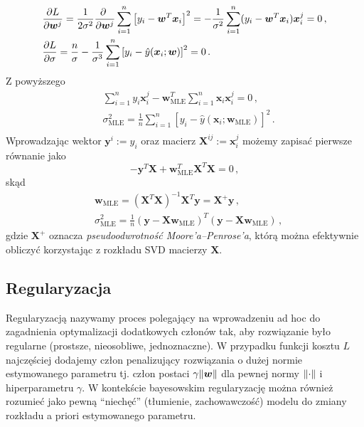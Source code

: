 \documentclass{myclass}
\numberwithin{equation}{subsection}
\begin{document}
\begin{equation}
    \begin{split}
        &\pdv{L}{\bm{w}^j} = \frac{1}{2\sigma^2}\pdv{~}{\bm{w}^j}\sum_{i=1}^n\left[y_i - \bm{w}^T\bm{x}_i\right]^2 = -\frac{1}{\sigma^2}\sum_{i=1}^n (y_i - \bm{w}^T\bm{x}_i)\bm{x}_i^j = 0\,,\\
        &\pdv{L}{\sigma} = \frac{n}{\sigma} - \frac{1}{\sigma^3}\sum_{i=1}^n \left[y_i - \hat{y}(\bm{x}_i; \bm{w})\right]^2 = 0\,.
    \end{split}
\end{equation}
Z powyższego
\begin{equation}
    \begin{split}
        &\sum_{i=1}^n y_i\bm{x}_i^j - \bm{w}_\mathrm{MLE}^T\sum_{i=1}^n\bm{x}_i\bm{x}_i^j = 0\,,\\
        &\sigma_\mathrm{MLE}^2 = \frac{1}{n} \sum_{i=1}^n \left[y_i - \hat{y}(\bm{x}_i; \bm{w}_\mathrm{MLE})\right]^2\,.\\
    \end{split}
\end{equation}
Wprowadzając wektor \(\bm{y}^i := y_i\) oraz macierz \(\bm{X}^{ij} := \bm{x}_i^j\) możemy zapisać
pierwsze równanie jako
\begin{equation}
    -\bm{y}^T\bm{X} + \bm{w}^T_\mathrm{MLE} \bm{X}^T\bm{X} = 0\,,
\end{equation}
skąd
\begin{equation}\boxed{
    \begin{split}
        &\bm{w}_\mathrm{MLE} = \left(\bm{X}^T\bm{X}\right)^{-1}\bm{X}^T\bm{y} = \bm{X}^+\bm{y}\,,\\
        &\sigma_\mathrm{MLE}^2 = \frac{1}{n}\left(\bm{y} - \bm{X}\bm{w}_\mathrm{MLE}\right)^T\left(\bm{y} - \bm{X}\bm{w}_\mathrm{MLE}\right)\,,
    \end{split}
}\end{equation}
gdzie \(\bm{X}^+\) oznacza \emph{pseudoodwrotność Moore'a--Penrose'a}, którą można efektywnie
obliczyć korzystając z rozkładu SVD macierzy \(\bm{X}\).


\subsection{Regularyzacja}

Regularyzacją  nazywamy proces polegający na wprowadzeniu ad hoc do zagadnienia optymalizacji
dodatkowych członów tak, aby rozwiązanie było regularne (prostsze, nieosobliwe, jednoznaczne). W
przypadku funkcji kosztu \(L\) najczęściej dodajemy człon penalizujący rozwiązania o dużej normie
estymowanego parametru tj. człon postaci \(\gamma \norm{\bm{w}}\) dla pewnej normy \(\norm{\cdot}\)
i hiperparametru \(\gamma\). W kontekście bayesowskim regularyzację można również rozumieć jako
pewną \enquote{niechęć} (tłumienie, zachowawczość) modelu do zmiany rozkładu a priori estymowanego
parametru.
\end{document}
